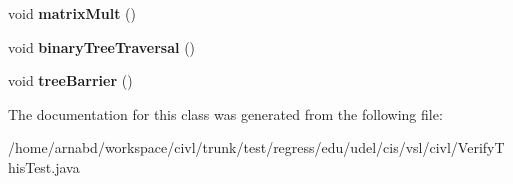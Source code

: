 \begin{DoxyCompactItemize}
\item 
\hypertarget{classedu_1_1udel_1_1cis_1_1vsl_1_1civl_1_1VerifyThisTest_a9d686a0cdfaa8c22cf2faca8cd55ecdd}{}void {\bfseries matrix\+Mult} ()\label{classedu_1_1udel_1_1cis_1_1vsl_1_1civl_1_1VerifyThisTest_a9d686a0cdfaa8c22cf2faca8cd55ecdd}

\item 
\hypertarget{classedu_1_1udel_1_1cis_1_1vsl_1_1civl_1_1VerifyThisTest_a25867cfa1ae25fb12223b404efdfd09b}{}void {\bfseries binary\+Tree\+Traversal} ()\label{classedu_1_1udel_1_1cis_1_1vsl_1_1civl_1_1VerifyThisTest_a25867cfa1ae25fb12223b404efdfd09b}

\item 
\hypertarget{classedu_1_1udel_1_1cis_1_1vsl_1_1civl_1_1VerifyThisTest_aec87420d840141be148a2194e1ff0090}{}void {\bfseries tree\+Barrier} ()\label{classedu_1_1udel_1_1cis_1_1vsl_1_1civl_1_1VerifyThisTest_aec87420d840141be148a2194e1ff0090}

\end{DoxyCompactItemize}


The documentation for this class was generated from the following file\+:\begin{DoxyCompactItemize}
\item 
/home/arnabd/workspace/civl/trunk/test/regress/edu/udel/cis/vsl/civl/Verify\+This\+Test.\+java\end{DoxyCompactItemize}
